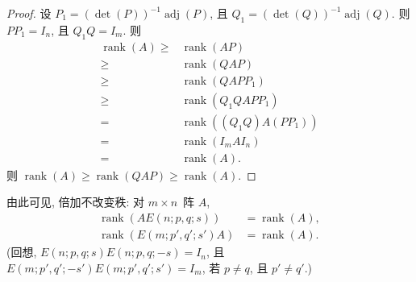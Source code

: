 \documentclass[../libro.tex]{subfiles}
\begin{document}
\begin{proof}
    设 \(P_1 = (\det {(P)})^{-1}
    \operatorname{adj} {(P)}\),
    且 \(Q_1 = (\det {(Q)})^{-1}
    \operatorname{adj} {(Q)}\).
    则 \(P P_1 = I_n\),
    且 \(Q_1 Q = I_m\).
    则
    \begin{align*}
        \operatorname{rank} {(A)}
        \geq {} &
        \operatorname{rank} {(AP)}
        \\
        \geq {} &
        \operatorname{rank} {(QAP)}
        \\
        \geq {} &
        \operatorname{rank} {(QAP P_1)}
        \\
        \geq {} &
        \operatorname{rank} {(Q_1 QAP P_1)}
        \\
        = {} &
        \operatorname{rank} {((Q_1 Q) A (P P_1))}
        \\
        = {} &
        \operatorname{rank} {(I_m A I_n)}
        \\
        = {} &
        \operatorname{rank} {(A)}.
    \end{align*}
    则
    \(\operatorname{rank} {(A)}
        \geq \operatorname{rank} {(Q A P)}
    \geq \operatorname{rank} {(A)}\).
\end{proof}

由此可见, 倍加不改变秩:
对 \(m \times n\)~阵 \(A\),
\begin{align*}
    \operatorname{rank} {(A E(n; p, q; s))}
    & = \operatorname{rank} {(A)}, \\
    \operatorname{rank} {(E(m; p', q'; s') A)}
    & = \operatorname{rank} {(A)}.
\end{align*}
(回想, \(E(n; p, q; s) E(n; p, q; -s) = I_n\), %
且 \(E(m; p', q'; -s') E(m; p', q'; s') = I_m\),
若 \(p \neq q\), 且 \(p' \neq q'\).) %
\end{document}
